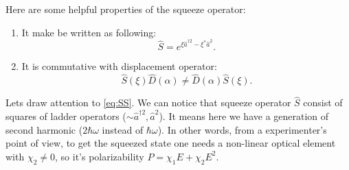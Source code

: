 Here are some helpful properties of the squeeze operator:
\begin{enumerate}
	\item It make be written as following:
	\begin{equation}
		\hat{S} = e^{\xi \hat{a}^{\dagger 2} - \xi^* \hat{a}^2}.
		\label{eq:SS}
	\end{equation}
	\item It is commutative with displacement operator:
	\begin{equation}
		\hat{S} (\xi) \hat{D} (\alpha) \neq  \hat{D} (\alpha) \hat{S} (\xi).
	\end{equation}
\end{enumerate}

Lets draw attention to \eqref{eq:SS}. We can notice that squeeze operator $\hat{S}$ consist of squares of ladder operators ($\sim \hat{a}^{\dagger 2}, \hat{a}^{2}$). It means here we have a generation of second harmonic ($2 \hbar \omega$ instead of $\hbar \omega$). In other words,  from a experimenter's point of view, to get the squeezed state one needs a non-linear optical element with $\chi_2 \neq 0$, so it's polarizability $P = \chi_1 E + \chi_2 E^2$. 